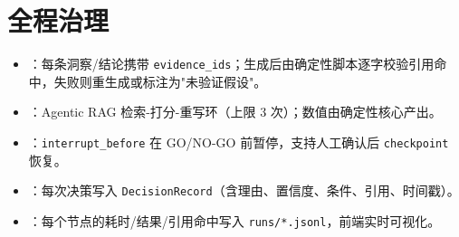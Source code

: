 \section{全程治理}

\begin{itemize}
\item {}：每条洞察/结论携带 \texttt{evidence\_ids}；生成后由确定性脚本逐字校验引用命中，失败则重生成或标注为"未验证假设"。
\item {}：Agentic RAG 检索-打分-重写环（上限 3 次）；数值由确定性核心产出。
\item {}：\texttt{interrupt\_before} 在 GO/NO-GO 前暂停，支持人工确认后 \texttt{checkpoint} 恢复。
\item {}：每次决策写入 \texttt{DecisionRecord}（含理由、置信度、条件、引用、时间戳）。
\item {}：每个节点的耗时/结果/引用命中写入 \texttt{runs/*.jsonl}，前端实时可视化。
\end{itemize}
